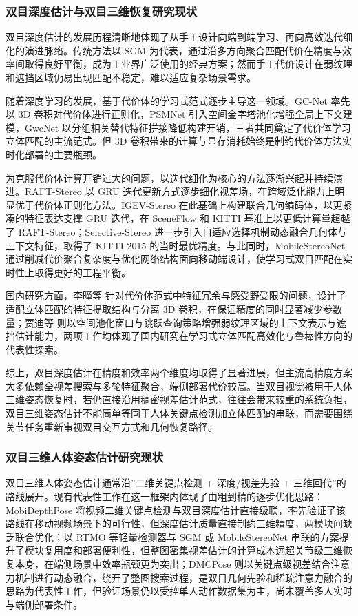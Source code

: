 \subsubsection{双目深度估计与双目三维恢复研究现状}
双目深度估计的发展历程清晰地体现了从手工设计向端到端学习、再向高效迭代细化的演进脉络。传统方法以 SGM 为代表，通过沿多方向聚合匹配代价在精度与效率间取得良好平衡，成为工业界广泛使用的经典方案；然而手工代价设计在弱纹理和遮挡区域仍易出现匹配不稳定，难以适应复杂场景需求。

随着深度学习的发展，基于代价体的学习式范式逐步主导这一领域。GC-Net 率先以 3D 卷积对代价体进行正则化，PSMNet 引入空间金字塔池化增强全局上下文建模，GwcNet 以分组相关替代特征拼接降低构建开销，三者共同奠定了代价体学习立体匹配的主流范式。但 3D 卷积带来的计算与显存消耗始终是制约代价体方法实时化部署的主要瓶颈。

为克服代价体计算开销过大的问题，以迭代细化为核心的方法逐渐兴起并持续演进。RAFT-Stereo 以 GRU 迭代更新方式逐步细化视差场，在跨域泛化能力上明显优于代价体正则化方法。IGEV-Stereo 在此基础上构建联合几何编码体，以更紧凑的特征表达支撑 GRU 迭代，在 SceneFlow 和 KITTI 基准上以更低计算量超越了 RAFT-Stereo；Selective-Stereo 进一步引入自适应选择机制动态融合几何体与上下文特征，取得了 KITTI 2015 的当时最优精度。与此同时，MobileStereoNet 通过削减代价聚合复杂度与优化网络结构面向移动端设计，使学习式双目匹配在实时性上取得更好的工程平衡。

国内研究方面，李曈等 针对代价体范式中特征冗余与感受野受限的问题，设计了适配立体匹配的特征提取结构与分离 3D 卷积，在保证精度的同时显著减少参数量；贾迪等 则以空间池化窗口与跳跃查询策略增强弱纹理区域的上下文表示与遮挡估计能力，两项工作均体现了国内研究在学习式立体匹配高效化与鲁棒性方向的代表性探索。

综上，双目深度估计在精度和效率两个维度均取得了显著进展，但主流高精度方案大多依赖全视差搜索与多轮特征聚合，端侧部署代价较高。当双目视觉被用于人体三维姿态恢复时，若仍直接沿用稠密视差估计范式，往往会带来较重的系统负担，双目三维姿态估计不能简单等同于人体关键点检测加立体匹配的串联，而需要围绕关节任务重新审视双目交互方式和几何恢复路径。
\subsubsection{双目三维人体姿态估计研究现状}
双目三维人体姿态估计通常沿”二维关键点检测 + 深度/视差先验 + 三维回代”的路线展开。现有代表性工作在这一框架内体现了由粗到精的逐步优化思路：MobiDepthPose 将视频二维关键点检测与双目深度估计直接级联，率先验证了该路线在移动视频场景下的可行性，但深度估计质量直接制约三维精度，两模块间缺乏联合优化；以 RTMO 等轻量检测器与 SGM 或 MobileStereoNet 串联的方案提升了模块复用度和部署便利性，但整图密集视差估计的计算成本远超关节级三维恢复本身，在端侧场景中效率瓶颈更为突出；DMCPose 则以关键点级视差结合注意力机制进行动态融合，绕开了整图搜索过程，是双目几何先验和稀疏注意力融合的思路为代表性工作，但验证场景仍以受控单人动作数据集为主，尚未覆盖多人实时与端侧部署条件。

